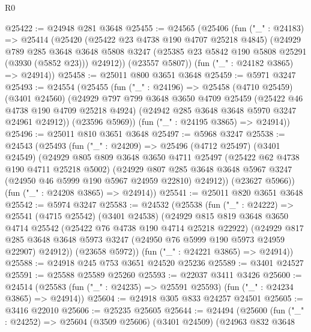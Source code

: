 \begin{lexlean}{R0}
\begin{coremodule}
@25422 := @24948 @281 @3648
@25455 := @24565
    (@25406
      (fun ("_" : @24183) =>
      @25414
        (@25420
          (@25422 @23 @4738 @190 @4707 @25218 @4845)
          (@24929
            @789
            @285
            @3648
            @3648
            @5808
            @3247
            (@25385 @23 @5842 @190 @5808 @25291 (@3930 (@5852 @23)))
            @24912))
        (@23557 @5807))
      (fun ("_" : @24182 @3865) => @24914))
@25458 := @25011 @800 @3651 @3648
@25459 := @5971 @3247
@25493 := @24554
    (@25455
      (fun ("_" : @24196) =>
      @25458
        (@4710 @25459)
        (@3401 @24560)
        (@24929
          @797
          @799
          @3648
          @3650
          @4709
          @25459
          (@25422 @46 @4738 @190 @4709 @25218 @4924)
          (@24942 @285 @3648 @3648 @5970 @3247 @24961 @24912))
        (@23596 @5969))
      (fun ("_" : @24195 @3865) => @24914))
@25496 := @25011 @810 @3651 @3648
@25497 := @5968 @3247
@25538 := @24543
    (@25493
      (fun ("_" : @24209) =>
      @25496
        (@4712 @25497)
        (@3401 @24549)
        (@24929
          @805
          @809
          @3648
          @3650
          @4711
          @25497
          (@25422 @62 @4738 @190 @4711 @25218 @5002)
          (@24929
            @807
            @285
            @3648
            @3648
            @5967
            @3247
            (@24950 @46 @5999 @190 @5967 @24959 @22810)
            @24912))
        (@23627 @5966))
      (fun ("_" : @24208 @3865) => @24914))
@25541 := @25011 @820 @3651 @3648
@25542 := @5974 @3247
@25583 := @24532
    (@25538
      (fun ("_" : @24222) =>
      @25541
        (@4715 @25542)
        (@3401 @24538)
        (@24929
          @815
          @819
          @3648
          @3650
          @4714
          @25542
          (@25422 @76 @4738 @190 @4714 @25218 @22922)
          (@24929
            @817
            @285
            @3648
            @3648
            @5973
            @3247
            (@24950 @76 @5999 @190 @5973 @24959 @22907)
            @24912))
        (@23658 @5972))
      (fun ("_" : @24221 @3865) => @24914))
@25588 := @24918 @245 @753 @3651 @24520 @25236
@25589 := @3401 @24527
@25591 := @25588 @25589 @25260
@25593 := @22037 @3411 @3426
@25600 := @24514 (@25583 (fun ("_" : @24235) => @25591 @25593) (fun ("_" : @24234 @3865) => @24914))
@25604 := @24918 @305 @833 @24257 @24501
@25605 := @3416 @22010
@25606 := @25235 @25605
@25644 := @24494
    (@25600
      (fun ("_" : @24252) =>
      @25604
        (@3509 @25606)
        (@3401 @24509)
        (@24963
          @832
          @3648

\end{coremodule}
\end{lexlean}
